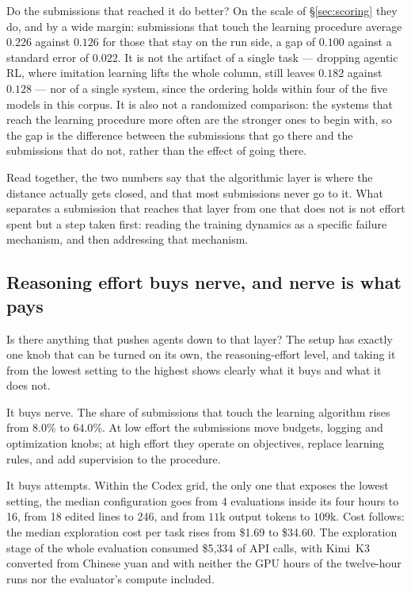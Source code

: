 Do the submissions that reached it do better? On the scale of \S\ref{sec:scoring} they do, and by a
wide margin: submissions that touch the learning procedure average $0.226$ against $0.126$ for those
that stay on the run side, a gap of $0.100$ against a standard error of $0.022$. It is not the
artifact of a single task --- dropping agentic RL, where imitation learning lifts the whole column,
still leaves $0.182$ against $0.128$ --- nor of a single system, since the ordering holds within four
of the five models in this corpus. It is also not a randomized comparison: the systems that reach the
learning procedure more often are the stronger ones to begin with, so the gap is the difference
between the submissions that go there and the submissions that do not, rather than the effect of
going there.

Read together, the two numbers say that the algorithmic layer is where the distance actually gets
closed, and that most submissions never go to it. What separates a submission that reaches that layer
from one that does not is not effort spent but a step taken first: reading the training dynamics as a
specific failure mechanism, and then addressing that mechanism.

\subsection{Reasoning effort buys nerve, and nerve is what pays}
\label{sec:effort}

Is there anything that pushes agents down to that layer? The setup has exactly one knob that can be
turned on its own, the reasoning-effort level, and taking it from the lowest setting to the highest
shows clearly what it buys and what it does not.

It buys nerve. The share of submissions that touch the learning algorithm rises from $8.0\%$ to
$64.0\%$. At low effort the submissions move
budgets, logging and optimization knobs; at high effort they operate on objectives, replace learning
rules, and add supervision to the procedure.

It buys attempts. Within the Codex grid, the only one that exposes the lowest setting, the median
configuration goes from 4 evaluations inside its four hours to 16, from
18 edited lines to 246, and from $11$k output tokens to $109$k. Cost follows: the median exploration
cost per task rises from \$1.69 to \$34.60. The exploration stage of the whole
evaluation consumed \$5{,}334 of API calls, with Kimi~K3 converted from Chinese yuan and with neither
the GPU hours of the twelve-hour runs nor the evaluator's compute included.

